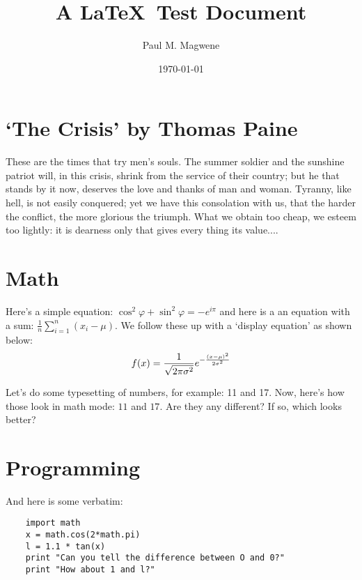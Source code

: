 
\newcommand{\normdistn}{\ensuremath{%
f(x) = 
\frac{1}{\sqrt{2\pi\sigma^2}} e^{-\frac{(x-\mu)^2}{2\sigma^2}}
}}

\newcommand{\varx}{\ensuremath{\frac{1}{n}\sum_{i=1}^{n}(x_i-\mu)}}


\title{\LARGE A \LaTeX\ Test Document}
\author{\large Paul M. Magwene}
\date{\large\today}


\maketitle
    
\section{`The Crisis' by Thomas Paine}

These are the times that try men's souls. The summer soldier and the sunshine patriot will, in this crisis, shrink from the service of their country; but he that stands by it now, deserves the love and thanks of man and woman. Tyranny, like hell, is not easily conquered; yet we have this consolation with us, that the harder the conflict, the more glorious the triumph. What we obtain too cheap, we esteem too lightly: it is dearness only that gives every thing its value....


\section{Math}

Here's a simple equation: $\cos^2 \varphi + \sin^2 \varphi = -e^{i\pi}$ and here is a an equation with a sum: \varx. We follow these up with a `display equation' as shown below:
\[
\normdistn
\]

Let's do some typesetting of numbers, for example: 11 and 17. Now, here's how those look in math mode: $11$ and $17$. Are they any different? If so, which looks better?

\section{Programming}

And here is some verbatim:
\begin{verbatim}
    import math
    x = math.cos(2*math.pi)
    l = 1.1 * tan(x)
    print "Can you tell the difference between O and 0?"
    print "How about 1 and l?"
\end{verbatim}  

